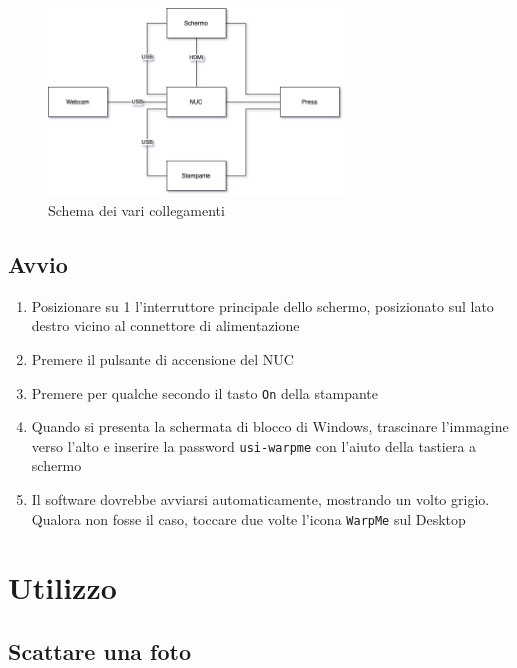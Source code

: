 \documentclass[12pt]{article}
\begin{document}
		\begin{figure}[H]
                \centering
                \includegraphics[width=0.7\textwidth]{img/cables_it.png}
                \caption{Schema dei vari collegamenti}
                \label{cables}
        \end{figure}
		
		
	\subsection{Avvio}
	
	\begin{enumerate}		
		\item Posizionare su 1 l'interruttore principale dello schermo, posizionato sul lato destro vicino al connettore di alimentazione
		\item Premere il pulsante di accensione del NUC
		\item Premere per qualche secondo il tasto \texttt{On} della stampante
		\item Quando si presenta la schermata di blocco di Windows, trascinare l'immagine verso l'alto e inserire la password \texttt{usi-warpme} con l'aiuto della tastiera a schermo
		\item Il software dovrebbe avviarsi automaticamente, mostrando un volto grigio. Qualora non fosse il caso, toccare due volte l'icona \texttt{WarpMe} sul Desktop
	\end{enumerate}	
		
		
		
\section{Utilizzo}

	\subsection{Scattare una foto}
\end{document}
